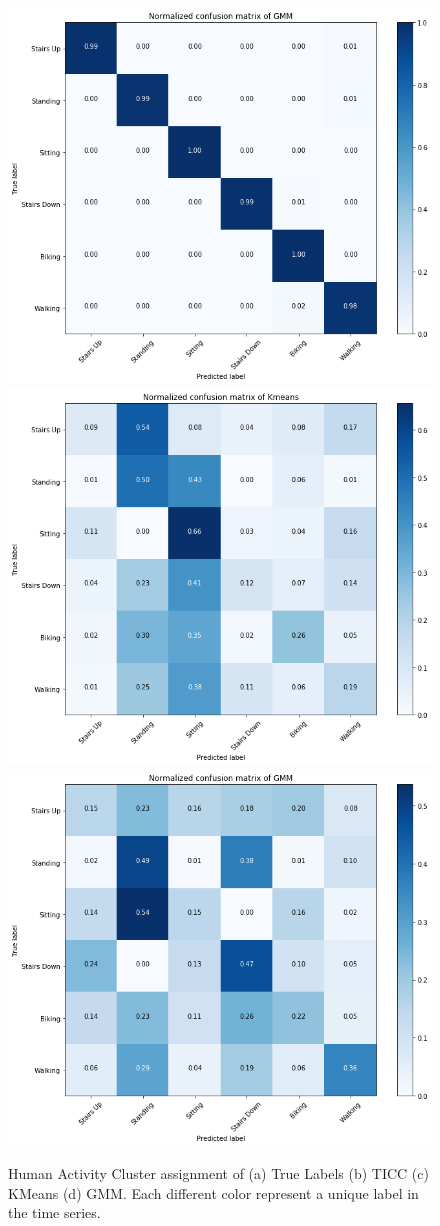 \documentclass{llncs}
\begin{document}
\begin{figure}[H]
	\centering
	\includegraphics[width=.49\textwidth]{CFM_TICC.png}
	\includegraphics[width=.49\textwidth]{CFM_Kmeans.png}
	\includegraphics[width=.49\textwidth]{CFM_GMM.png}
	\caption{Human Activity Cluster assignment of (a) True Labels (b) TICC (c) KMeans (d) GMM. Each different color represent a unique label in the time series.}
	\label{fig:human_cfm}
\end{figure}
\end{document}
